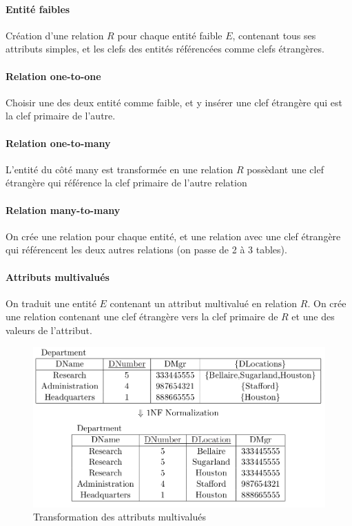 \documentclass[a4paper]{article}
\begin{document}
\paragraph{Entité faibles}
Création d'une relation $R$ pour chaque entité faible $E$, contenant tous ses
attributs simples, et les clefs des entités référencées comme clefs étrangères.

\paragraph{Relation one-to-one}
Choisir une des deux entité comme faible, et y insérer une clef étrangère qui
est la clef primaire de l'autre.

\paragraph{Relation one-to-many}
L'entité du côté many est transformée en une relation $R$ possèdant une clef étrangère
qui référence la clef primaire de l'autre relation

\paragraph{Relation many-to-many}
On crée une relation pour chaque entité, et une relation avec une clef étrangère
qui référencent les deux autres relations (on passe de 2 à 3 tables).

\paragraph{Attributs multivalués}
On traduit une entité $E$ contenant un attribut multivalué en relation $R$.
On crée une relation contenant une clef étrangère vers la clef primaire de $R$ et
une des valeurs de l'attribut.
\begin{figure}[H]
    \center
    \includegraphics[width=.7\textwidth]{fig/multiattrs-1nf.png}
    \caption{Transformation des attributs multivalués}
\end{figure}
\end{document}
